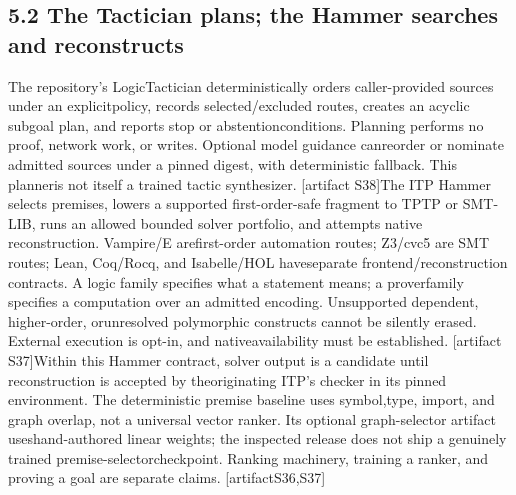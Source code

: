 \subsection*{5.2  The Tactician plans; the Hammer searches and reconstructs}
\noindent
The repository's LogicTactician deterministically orders caller-provided sources under an explicit\linebreak[4]
policy, records selected/excluded routes, creates an acyclic subgoal plan, and reports stop or abstention\linebreak[4]
conditions. Planning performs no proof, network work, or writes. Optional model guidance can\linebreak[4]
reorder or nominate admitted sources under a pinned digest, with deterministic fallback. This planner\linebreak[4]
is not itself a trained tactic synthesizer. [artifact S38]\linebreak[4]
The ITP Hammer selects premises, lowers a supported first-order-safe fragment to TPTP or SMT-\linebreak[4]
LIB, runs an allowed bounded solver portfolio, and attempts native reconstruction. Vampire/E are\linebreak[4]
first-order automation routes; Z3/cvc5 are SMT routes; Lean, Coq/Rocq, and Isabelle/HOL have\linebreak[4]
separate frontend/reconstruction contracts. A logic family specifies what a statement means; a prover\linebreak[4]
family specifies a computation over an admitted encoding. Unsupported dependent, higher-order, or\linebreak[4]
unresolved polymorphic constructs cannot be silently erased. External execution is opt-in, and native\linebreak[4]
availability must be established. [artifact S37]\linebreak[4]
Within this Hammer contract, solver output is a candidate until reconstruction is accepted by the\linebreak[4]
originating ITP's checker in its pinned environment. The deterministic premise baseline uses symbol,\linebreak[4]
type, import, and graph overlap, not a universal vector ranker. Its optional graph-selector artifact uses\linebreak[4]
hand-authored linear weights; the inspected release does not ship a genuinely trained premise-selector\linebreak[4]
checkpoint. Ranking machinery, training a ranker, and proving a goal are separate claims. [artifact\linebreak[4]
S36,S37]\par

